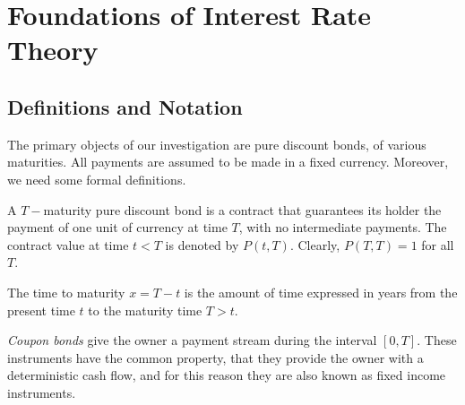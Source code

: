 
\chapter{Foundations of Interest Rate Theory}
\section{Definitions and Notation}


The primary objects of our investigation are pure discount bonds, of
various maturities. All payments are assumed to be made in a fixed
currency. Moreover, we need some formal definitions.   
 
\begin{defn} A $T-$maturity pure discount bond is a
  contract that guarantees its holder the payment of one unit of
  currency at time $T$, with no intermediate payments. The contract
  value at time $t < T$ is denoted by $P(t,T)$. Clearly, $P(T,T) = 1$
  for all 
$T$.
\end{defn}

\begin{defn} The time to maturity $x=T-t$ is the
amount of time expressed in years from the present time $t$ to the
maturity time $T > t$. 
\end{defn}

{\sl Coupon bonds} give the owner a payment stream during the interval
$[0,T]$. These instruments have the common property, that they provide
the owner with a deterministic cash flow, and for this reason they are
also known as fixed income instruments.  

